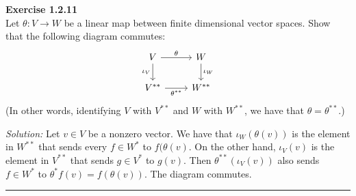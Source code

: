 \documentclass[a4paper, 11pt]{article}
\newenvironment{problem}[2][Exercise]
    { \begin{mdframed}[backgroundcolor=gray!20] \textbf{#1 #2} \\}
    {  \end{mdframed}}
\newenvironment{solution}
    {\textit{Solution:}}
    {}
\begin{document}
\begin{problem}{1.2.11}
    Let \(\theta:V\rightarrow W\) be a linear map between finite dimensional vector spaces. Show that the following diagram commutes:
$$\begin{tikzcd}
	V & W \\
	{V^{**}} & {W^{**}}
	\arrow["\theta", from=1-1, to=1-2]
	\arrow["{\iota_V}"', from=1-1, to=2-1]
	\arrow["{\iota_W}", from=1-2, to=2-2]
	\arrow["{\theta^{**}}"', from=2-1, to=2-2]
\end{tikzcd}$$
(In other words, identifying \(V\) with \(V^{**}\) and \(W\) with \(W^{**}\), we have that \(\theta=\theta^{**}\).)
\end{problem}
\begin{solution}
Let \(v\in V\) be a nonzero vector. We have that \(\iota_W(\theta(v))\) is the element in \(W^{**}\) that sends every \(f\in W^*\) to \(f(\theta(v)\). On the other hand, \(\iota_V(v)\) is the element in \(V^{**}\) that sends \(g\in V^*\) to \(g(v)\). Then \(\theta^{**}(\iota_V(v))\) also sends \(f\in W^*\) to \(\theta^*f(v)=f(\theta(v))\). The diagram commutes.
\\
\end{solution}
\noindent\rule{7in}{2.8pt}
\end{document}
